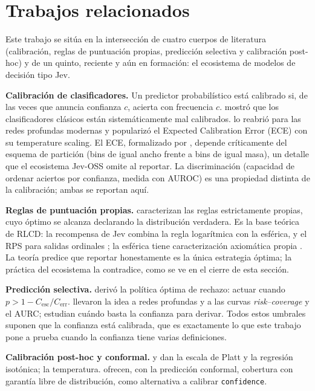 \section{Trabajos relacionados}
\label{sec:trabajos_relacionados}

Este trabajo se sitúa en la intersección de cuatro cuerpos de literatura (calibración, reglas de puntuación
propias, predicción selectiva y calibración post-hoc) y de un quinto, reciente y aún en formación: el
ecosistema de modelos de decisión tipo Jev.

\textbf{Calibración de clasificadores.} Un predictor probabilístico está calibrado si, de las veces que
anuncia confianza $c$, acierta con frecuencia $c$. \cite{niculescu2005} mostró que los clasificadores
clásicos están sistemáticamente mal calibrados. \cite{guo2017} lo reabrió para las redes profundas modernas
y popularizó el Expected Calibration Error (ECE) con su temperature scaling. El ECE,
formalizado por \cite{naeini2015}, depende críticamente del esquema de partición (bins de igual ancho frente
a bins de igual masa), un detalle que el ecosistema Jev-OSS omite al reportar. La discriminación
(capacidad de ordenar aciertos por confianza, medida con AUROC) es una propiedad distinta de la calibración;
ambas se reportan aquí.

\textbf{Reglas de puntuación propias.} \cite{gneiting2007} caracterizan las reglas estrictamente
propias, cuyo óptimo se alcanza declarando la distribución verdadera. Es la base teórica de RLCD: la
recompensa de Jev combina la regla logarítmica con la esférica, y el RPS para salidas ordinales
\cite{good1952,roby1965,epstein1969}; la esférica tiene caracterización axiomática propia
\cite{jose2009}. La teoría predice que reportar honestamente es la única estrategia óptima; la
práctica del ecosistema la contradice, como se ve en el cierre de esta sección.

\textbf{Predicción selectiva.} \cite{chow1970} derivó la política óptima de rechazo: actuar cuando
$p > 1 - C_{\mathrm{esc}}/C_{\mathrm{err}}$. \cite{geifman2017} llevaron la idea a redes profundas y a las
curvas \emph{risk--coverage} y el AURC; \cite{jitkrittum2023} estudian cuándo basta la confianza para
derivar. Todos estos umbrales suponen que la confianza está calibrada, que es exactamente lo que este
trabajo pone a prueba cuando la confianza tiene varias definiciones.

\textbf{Calibración post-hoc y conformal.} \cite{platt1999} y \cite{zadrozny2002} dan la escala de Platt y
la regresión isotónica; \cite{guo2017} la temperatura. \cite{vovk2005,angelopoulos2021} ofrecen, con la
predicción conformal, cobertura con garantía libre de distribución, como alternativa a calibrar
\texttt{confidence}.

